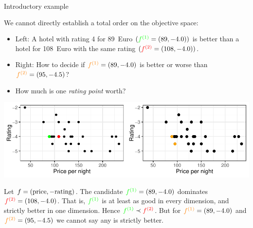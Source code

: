 \documentclass[11pt,compress,t,notes=noshow,xcolor=table]{beamer}
\begin{document}
\begin{vbframe}{Introductory example}
\framebreak

{\footnotesize
We cannot directly establish a total order on the objective space:
\begin{itemize}
  \item Left: A hotel with rating 4 for 89~Euro 
        \((\textcolor{green}{f^{(1)}} = (89, -4.0))\) 
        is better than a hotel for 108~Euro with the same rating
        \((\textcolor{red}{f^{(2)}} = (108, -4.0))\).
  \item Right: How to decide if 
        \(\textcolor{orange}{f^{(1)}}=(89, -4.0)\) is better or worse than 
        \(\textcolor{orange}{f^{(2)}}=(95, -4.5)\)?
  \item How much is one \emph{rating point} worth?
\end{itemize}

\begin{center}
\includegraphics[scale=1]{figure_man/expedia-2-1.pdf}
\end{center}

\vspace{-0.1cm}

Let \(f = (\text{price}, -\text{rating})\). The candidate 
\(\textcolor{green}{f^{(1)}}=(89,-4.0)\)
dominates 
\(\textcolor{red}{f^{(2)}}=(108,-4.0)\). 
That is, \(\textcolor{green}{f^{(1)}}\) is at least as good 
in every dimension, and strictly better in one dimension.
Hence $\textcolor{green}{f^{(1)}} \prec \textcolor{red}{f^{(2)}}$. But for
\(\textcolor{orange}{f^{(1)}}=(89,-4.0)\) and \(\textcolor{orange}{f^{(2)}}=(95,-4.5)\)
we cannot say any is strictly better.


}


\end{vbframe}
\end{document}
